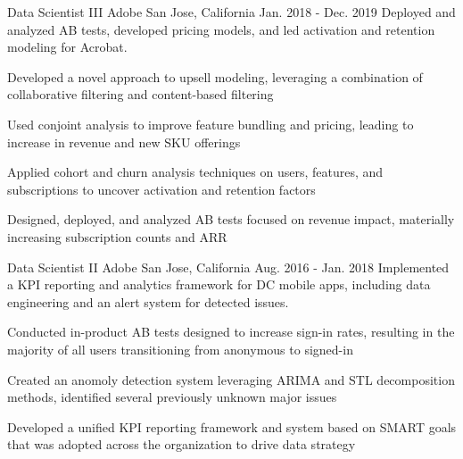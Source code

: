 \begin{cventries}
\cventry
    {Data Scientist III} %
    {Adobe} %
    {San Jose, California} %
    {Jan. 2018 - Dec. 2019} %
    {Deployed and analyzed AB tests, developed pricing models, and led activation and retention modeling for Acrobat.} %
    {
      \begin{cvitems} %
        \item {Developed a novel approach to upsell modeling, leveraging a combination of collaborative filtering and content-based filtering}
        \item {Used conjoint analysis to improve feature bundling and pricing, leading to increase in revenue and new SKU offerings}
        \item {Applied cohort and churn analysis techniques on users, features, and subscriptions to uncover activation and retention factors}
        \item {Designed, deployed, and analyzed AB tests focused on revenue impact, materially increasing subscription counts and ARR}
      \end{cvitems}
    }

\cventry
    {Data Scientist II} %
    {Adobe} %
    {San Jose, California} %
    {Aug. 2016 - Jan. 2018} %
    {Implemented a KPI reporting and analytics framework for DC mobile apps, including data engineering and an alert system for detected issues.} %
    {
      \begin{cvitems} %
        \item {Conducted in-product AB tests designed to increase sign-in rates, resulting in the majority of all users transitioning from anonymous to signed-in}
        \item {Created an anomoly detection system leveraging ARIMA and STL decomposition methods, identified several previously unknown major issues}
        \item {Developed a unified KPI reporting framework and system based on SMART goals that was adopted across the organization to drive data strategy}
      \end{cvitems}
    }

\end{cventries}
